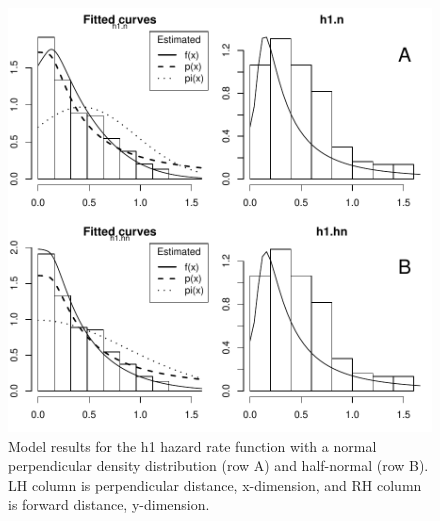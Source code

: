 \documentclass{article}
\begin{document}
\clearpage
\begin{figure}
\begin{center}
\includegraphics{WC86R1-figmod1}
\end{center}
\caption{Model results for the h1 hazard rate function with a normal perpendicular density distribution (row A) and 
half-normal (row B). LH column is perpendicular distance, x-dimension, and RH column is forward distance, y-dimension. }
\label{fig:mod1and2}
\end{figure}
\clearpage
\end{document}
